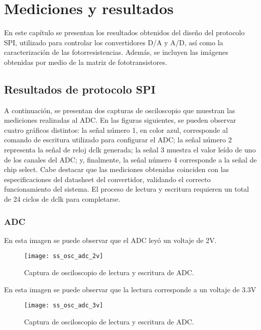 \chapter{Mediciones y resultados}
En este capítulo se presentan los resultados obtenidos del diseño del protocolo SPI, utilizado para controlar los convertidores D/A y A/D, así como la caracterización de las fotorresistencias. Además, se incluyen las imágenes obtenidas por medio de la matriz de fototransistores.


\section{Resultados de protocolo SPI}
A continuación, se presentan dos capturas de osciloscopio que muestran las mediciones realizadas al ADC. En las figuras siguientes, se pueden observar cuatro gráficos distintos: la señal número 1, en color azul, corresponde al comando de escritura utilizado para configurar el ADC; la señal número 2 representa la señal de reloj dclk generada; la señal 3 muestra el valor leído de uno de los canales del ADC; y, finalmente, la señal número 4 corresponde a la señal de chip select. Cabe destacar que las mediciones obtenidas coinciden con las especificaciones del datasheet del convertidor, validando el correcto funcionamiento del sistema. El proceso de lectura y escritura requieren un total de 24 ciclos de dclk para completarse.
\newpage
\subsection{ADC}
En esta imagen se puede observar que el ADC leyó un voltaje de 2V.

            \begin{figure}[hbtp]
                \centering
                \texttt{[image: ss\_osc\_adc\_2v]}
                \caption{Captura de osciloscopio de lectura y escritura de ADC.}
                \label{fig:ss_osc_adc_2v}
            \end{figure} 

En esta imagen se puede observar que la lectura corresponde a un voltaje de 3.3V
            \begin{figure}[hbtp]
                \centering
                \texttt{[image: ss\_osc\_adc\_3v]}
                \caption{Captura de osciloscopio de lectura y escritura de ADC.}
                \label{fig:ss_osc_adc_3v}
            \end{figure} 

